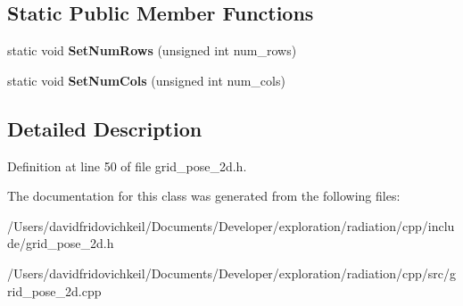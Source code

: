 \subsection*{Static Public Member Functions}
\begin{DoxyCompactItemize}
\item 
\hypertarget{classradiation_1_1_grid_pose2_d_a52d7cf9eef8c2f5dd738fb1b35d96ebf}{}\label{classradiation_1_1_grid_pose2_d_a52d7cf9eef8c2f5dd738fb1b35d96ebf} 
static void {\bfseries Set\+Num\+Rows} (unsigned int num\+\_\+rows)
\item 
\hypertarget{classradiation_1_1_grid_pose2_d_a271bbf951f14d1e75bac66ec4b1503b9}{}\label{classradiation_1_1_grid_pose2_d_a271bbf951f14d1e75bac66ec4b1503b9} 
static void {\bfseries Set\+Num\+Cols} (unsigned int num\+\_\+cols)
\end{DoxyCompactItemize}


\subsection{Detailed Description}


Definition at line 50 of file grid\+\_\+pose\+\_\+2d.\+h.



The documentation for this class was generated from the following files\+:\begin{DoxyCompactItemize}
\item 
/\+Users/davidfridovichkeil/\+Documents/\+Developer/exploration/radiation/cpp/include/grid\+\_\+pose\+\_\+2d.\+h\item 
/\+Users/davidfridovichkeil/\+Documents/\+Developer/exploration/radiation/cpp/src/grid\+\_\+pose\+\_\+2d.\+cpp\end{DoxyCompactItemize}
